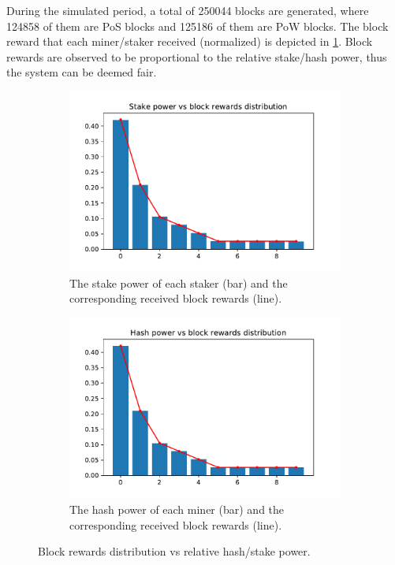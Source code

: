 \documentclass[a4paper]{article}
\begin{document}
During the simulated period, a total of 250044 blocks are generated, where 124858 of them are PoS blocks and 125186 of them are PoW blocks. The block reward that each miner/staker received (normalized) is depicted in \cref{fig:block-rewards}. Block rewards are observed to be proportional to the relative stake/hash power, thus the system can be deemed fair.

\begin{figure}
    \centering
    \begin{subfigure}[b]{0.45\textwidth}
        \includegraphics[width=\textwidth]{assets/stake-power-vs-rewards.pdf}
        \caption{The stake power of each staker (bar) and the corresponding received block rewards (line).}
    \end{subfigure}
    \begin{subfigure}[b]{0.45\textwidth}
        \includegraphics[width=\textwidth]{assets/hash-power-vs-rewards.pdf}
        \caption{The hash power of each miner (bar) and the corresponding received block rewards (line).}
    \end{subfigure}
    \caption{Block rewards distribution vs relative hash/stake power.}
    \label{fig:block-rewards}
\end{figure}
\end{document}

